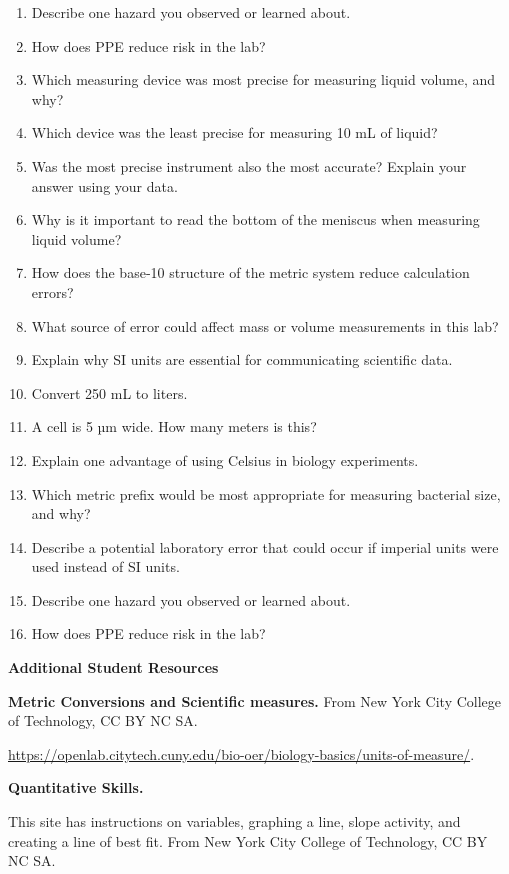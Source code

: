 \documentclass[
  letterpaper,
  DIV=11,
  numbers=noendperiod]{scrreprt}
\begin{document}
\begin{enumerate}
\def\labelenumi{\arabic{enumi}.}
\setcounter{enumi}{3}
\item
  Describe one hazard you observed or learned about.
\item
  How does PPE reduce risk in the lab?
\item
  Which measuring device was most precise for measuring liquid volume,
  and why?
\item
  Which device was the least precise for measuring 10 mL of liquid?
\item
  Was the most precise instrument also the most accurate? Explain your
  answer using your data.
\item
  Why is it important to read the bottom of the meniscus when measuring
  liquid volume?
\item
  How does the base‑10 structure of the metric system reduce calculation
  errors?
\item
  What source of error could affect mass or volume measurements in this
  lab?
\item
  Explain why SI units are essential for communicating scientific data.
\item
  Convert 250 mL to liters.
\item
  A cell is 5 µm wide. How many meters is this?
\item
  Explain one advantage of using Celsius in biology experiments.
\item
  Which metric prefix would be most appropriate for measuring bacterial
  size, and why?
\item
  Describe a potential laboratory error that could occur if imperial
  units were used instead of SI units.
\item
  Describe one hazard you observed or learned about.
\item
  How does PPE reduce risk in the lab?
\end{enumerate}

\textbf{Additional Student Resources}

\textbf{Metric Conversions and Scientific measures.} From New York City
College of Technology, CC BY NC SA.

\url{https://openlab.citytech.cuny.edu/bio-oer/biology-basics/units-of-measure/}.

\textbf{Quantitative Skills.}

This site has instructions on variables, graphing a line, slope
activity, and creating a line of best fit. From New York City College of
Technology, CC BY NC SA.
\end{document}
